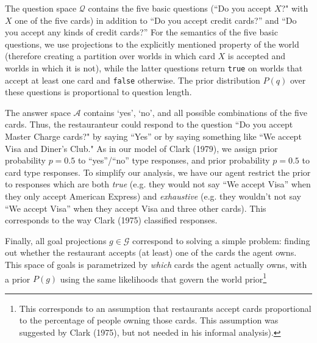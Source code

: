\documentclass[12pt, floatsintext, jou]{apa6}
\begin{document}
The question space $\mathcal{Q}$ contains the five basic questions (``Do you accept $X$?" with $X$ one of the five cards) in addition to ``Do you accept credit cards?'' and ``Do you accept any kinds of credit cards?'' For the semantics of the five basic questions, we use projections to the explicitly mentioned property of the world (therefore creating a partition over worlds in which card $X$ is accepted and worlds in which it is not), while the latter questions return \texttt{true} on worlds that accept at least one card and \texttt{false} otherwise.  The prior distribution $P(q)$ over these questions is proportional to question length.

The answer space $\mathcal{A}$ contains `yes', `no', and all possible combinations of the five cards. Thus, the restauranteur could respond to the question ``Do you accept Master Charge cards?" by saying ``Yes'' or by saying something like ``We accept Visa and Diner's Club." As in our model of Clark (1979), we assign prior probability $p = 0.5$ to ``yes''/``no'' type responses, and prior probability $p = 0.5$ to card type responses. To simplify our analysis, we have our agent restrict the prior to responses which are both \emph{true} (e.g. they would not say ``We accept Visa'' when they only accept American Express) and \emph{exhaustive} (e.g. they wouldn't not say ``We accept Visa'' when they accept Visa and three other cards). This corresponds to the way Clark (1975) classified responses. 

Finally, all goal projections $g \in \mathcal{G}$ correspond to solving a simple problem: finding out whether the restaurant accepts (at least) one of the cards the agent owns. This space of goals is parametrized by \emph{which} cards the agent actually owns, with a prior $P(g)$ using the same likelihoods that govern the world prior\footnote{This corresponds to an assumption that restaurants accept cards proportional to the percentage of people owning those cards. This assumption was suggested by Clark (1975), but not needed in his informal analysis).}

\end{document}
